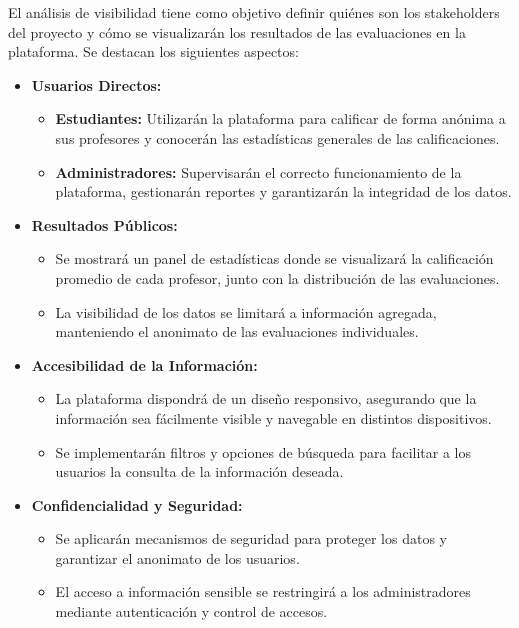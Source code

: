 \documentclass[11pt]{article}
\begin{document}
El análisis de visibilidad tiene como objetivo definir quiénes son los stakeholders del proyecto y cómo se visualizarán los resultados de las evaluaciones en la plataforma. Se destacan los siguientes aspectos:

\begin{itemize}
    \item \textbf{Usuarios Directos:} 
    \begin{itemize}
        \item \textbf{Estudiantes:} Utilizarán la plataforma para calificar de forma anónima a sus profesores y conocerán las estadísticas generales de las calificaciones.
        \item \textbf{Administradores:} Supervisarán el correcto funcionamiento de la plataforma, gestionarán reportes y garantizarán la integridad de los datos.
    \end{itemize}
    \item \textbf{Resultados Públicos:} 
    \begin{itemize}
        \item Se mostrará un panel de estadísticas donde se visualizará la calificación promedio de cada profesor, junto con la distribución de las evaluaciones.
        \item La visibilidad de los datos se limitará a información agregada, manteniendo el anonimato de las evaluaciones individuales.
    \end{itemize}
    \item \textbf{Accesibilidad de la Información:} 
    \begin{itemize}
        \item La plataforma dispondrá de un diseño responsivo, asegurando que la información sea fácilmente visible y navegable en distintos dispositivos.
        \item Se implementarán filtros y opciones de búsqueda para facilitar a los usuarios la consulta de la información deseada.
    \end{itemize}
    \item \textbf{Confidencialidad y Seguridad:} 
    \begin{itemize}
        \item Se aplicarán mecanismos de seguridad para proteger los datos y garantizar el anonimato de los usuarios.
        \item El acceso a información sensible se restringirá a los administradores mediante autenticación y control de accesos.
    \end{itemize}
\end{itemize}
\end{document}
